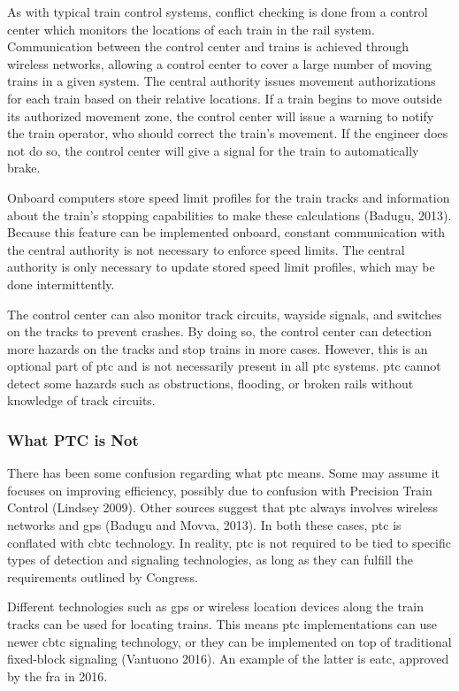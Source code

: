 \documentclass[11pt, titlepage]{article}
\begin{document}
As with typical train control systems, conflict checking is done from a control
center which monitors the locations of each train in the rail system. Communication
between the control center and trains is achieved through wireless networks,
allowing a control center to cover a large number of moving trains in a given
system. The central authority issues movement authorizations for each train based
on their relative locations. If a train begins to move outside its authorized
movement zone, the control center will issue a warning to notify the train
operator, who should correct the train’s movement. If the engineer does not do so,
the control center will give a signal for the train to automatically brake.

Onboard computers store speed limit profiles for the train tracks and information
about the train’s stopping capabilities to make these calculations (Badugu, 2013).
Because this feature can be implemented onboard, constant communication with the
central authority is not necessary to enforce speed limits. The central authority
is only necessary to update stored speed limit profiles, which may be done
intermittently.

The control center can also monitor track circuits, wayside signals, and switches
on the tracks to prevent crashes. By doing so, the control center can detection
more hazards on the tracks and stop trains in more cases. However, this is an
optional part of \gls{ptc} and is not necessarily present in all \gls{ptc} systems.
\gls{ptc} cannot detect some hazards such as obstructions, flooding, or broken
rails without knowledge of track circuits.

\subsubsection{What PTC is Not}

There has been some confusion regarding what \gls{ptc} means. Some may assume it
focuses on improving efficiency, possibly due to confusion with Precision Train
Control (Lindsey 2009). Other sources suggest that \gls{ptc} always involves
wireless networks and \gls{gps} (Badugu and Movva, 2013). In both these cases,
\gls{ptc} is conflated with \gls{cbtc} technology. In reality, \gls{ptc} is not
required to be tied to specific types of detection and signaling technologies, as
long as they can fulfill the requirements outlined by Congress.

Different technologies such as \gls{gps} or wireless location devices along the
train tracks can be used for locating trains. This means \gls{ptc} implementations
can use newer \gls{cbtc} signaling technology, or they can be implemented on top of
traditional fixed-block signaling (Vantuono 2016). An example of the latter is
\gls{eatc}, approved by the \gls{fra} in 2016.
\end{document}
